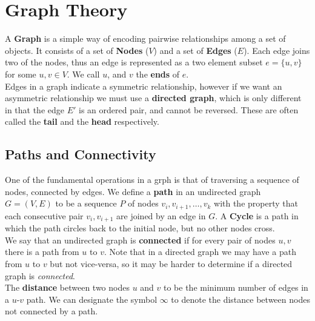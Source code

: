 \documentclass{report}
\theoremstyle{definition}
\begin{document}
\chapter{Graph Theory}
	A \textbf{Graph} is a simple way of encoding pairwise relationships among a set of objects. It consists of a set of 
	\textbf{Nodes} ($V$) and a set of \textbf{Edges} ($E$). Each edge joins two of the nodes, thus an edge is represented as a 
	two element subset $e=\{u,v\}$ for some $u, v \in V$. We call $u$, and $v$ the \textbf{ends} of $e$.\\

	Edges in a graph indicate a symmetric relationship, however if we want an asymmetric relationship we must use a 
	\textbf{directed graph}, which is only different in that the edge $E'$ is an ordered pair, and cannot be reversed. These
	are often called the \textbf{tail} and the \textbf{head} respectively.
	\section{Paths and Connectivity}
		One of the fundamental operations in a grph is that of traversing a sequence of nodes, connected by edges. We define a 
		\textbf{path} in an undirected graph $G = (V, E)$ to be a sequence $P$ of nodes $v_i, v_{i+1}, \dots, v_k$ with the
		property that each consecutive pair $v_i, v_{i+1}$ are joined by an edge in $G$. A \textbf{Cycle} is a path in which 
		the path circles back to the initial node, but no other nodes cross.\\
		
		We say that an undirected graph is \textbf{connected} if for every pair of nodes $u, v$ there is a path from $u$ to
		$v$. Note that in a directed graph we may have a path from $u$ to $v$ but not vice-versa, so it may be harder to 
		determine if a directed graph is \textit{connected}.\\

		The \textbf{distance} between two nodes $u$ and $v$ to be the minimum number of edges in a $u$-$v$ path. We 
		can designate the symbol $\infty$ to denote the distance between nodes not connected by a path.
\newpage
\end{document}
